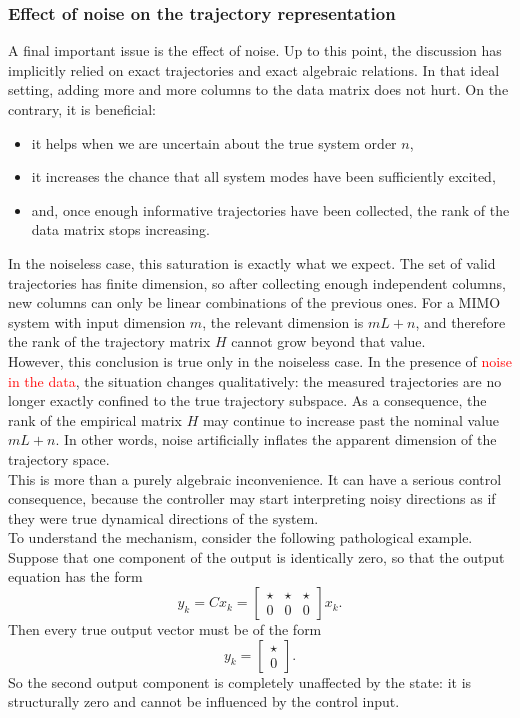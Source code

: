 \subsubsection{Effect of noise on the trajectory representation}
A final important issue is the effect of noise. Up to this point, the discussion has implicitly relied on exact trajectories and exact algebraic relations. In that ideal setting, adding more and more columns to the data matrix does not hurt. On the contrary, it is beneficial:
\begin{itemize}
    \item it helps when we are uncertain about the true system order \(n\),
    \item it increases the chance that all system modes have been sufficiently excited,
    \item and, once enough informative trajectories have been collected, the rank of the data matrix stops increasing.
\end{itemize}

In the noiseless case, this saturation is exactly what we expect. The set of valid trajectories has finite dimension, so after collecting enough independent columns, new columns can only be linear combinations of the previous ones. For a MIMO system with input dimension \(m\), the relevant dimension is \(mL+n\), and therefore the rank of the trajectory matrix \(H\) cannot grow beyond that value.\\
However, this conclusion is true only in the noiseless case. In the presence of \textcolor{red}{noise in the data}, the situation changes qualitatively: the measured trajectories are no longer exactly confined to the true trajectory subspace. As a consequence, the rank of the empirical matrix \(H\) may continue to increase past the nominal value \(mL+n\). In other words, noise artificially inflates the apparent dimension of the trajectory space.\\

This is more than a purely algebraic inconvenience. It can have a serious control consequence, because the controller may start interpreting noisy directions as if they were true dynamical directions of the system.\\
To understand the mechanism, consider the following pathological example. Suppose that one component of the output is identically zero, so that the output equation has the form
\[
y_k=Cx_k=
\begin{bmatrix}
\star & \star & \star\\
0 & 0 & 0
\end{bmatrix}x_k.
\]
Then every true output vector must be of the form
\[
y_k=
\begin{bmatrix}
\star\\
0
\end{bmatrix}.
\]
So the second output component is completely unaffected by the state: it is structurally zero and cannot be influenced by the control input.\\

